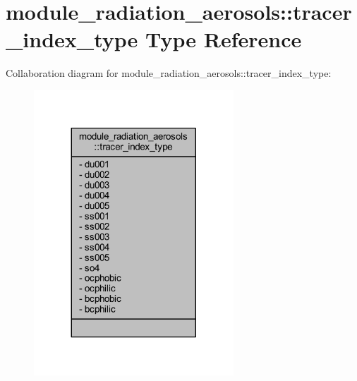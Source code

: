 \hypertarget{structmodule__radiation__aerosols_1_1tracer__index__type}{}\section{module\+\_\+radiation\+\_\+aerosols\+:\+:tracer\+\_\+index\+\_\+type Type Reference}
\label{structmodule__radiation__aerosols_1_1tracer__index__type}


Collaboration diagram for module\+\_\+radiation\+\_\+aerosols\+:\+:tracer\+\_\+index\+\_\+type\+:\nopagebreak
\begin{figure}[H]
\begin{center}
\leavevmode
\includegraphics[width=212pt]{structmodule__radiation__aerosols_1_1tracer__index__type__coll__graph}
\end{center}
\end{figure}
